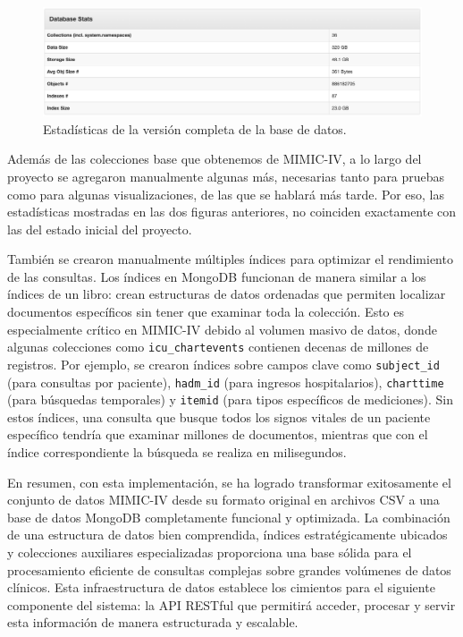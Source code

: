 \begin{figure}[H]
    \centering
    \includegraphics[width=1\textwidth]{imagenes/stats_full.png}
    \caption{Estadísticas de la versión completa de la base de datos.}
    \label{fig:stats_full}
\end{figure}


Además de las colecciones base que obtenemos de MIMIC-IV, a lo largo del proyecto se agregaron manualmente algunas más, necesarias tanto para pruebas como para algunas visualizaciones, de las que se hablará más tarde. Por eso, las estadísticas mostradas en las dos figuras anteriores, no coinciden exactamente con las del estado inicial del proyecto. 

También se crearon manualmente múltiples índices para optimizar el rendimiento de las consultas. Los índices en MongoDB funcionan de manera similar a los índices de un libro: crean estructuras de datos ordenadas que permiten localizar documentos específicos sin tener que examinar toda la colección. Esto es especialmente crítico en MIMIC-IV debido al volumen masivo de datos, donde algunas colecciones como \texttt{icu\_chartevents} contienen decenas de millones de registros. Por ejemplo, se crearon índices sobre campos clave como \texttt{subject\_id} (para consultas por paciente), \texttt{hadm\_id} (para ingresos hospitalarios), \texttt{charttime} (para búsquedas temporales) y \texttt{itemid} (para tipos específicos de mediciones). Sin estos índices, una consulta que busque todos los signos vitales de un paciente específico tendría que examinar millones de documentos, mientras que con el índice correspondiente la búsqueda se realiza en milisegundos.


En resumen, con esta implementación, se ha logrado transformar exitosamente el conjunto de datos MIMIC-IV desde su formato original en archivos CSV a una base de datos MongoDB completamente funcional y optimizada. La combinación de una estructura de datos bien comprendida, índices estratégicamente ubicados y colecciones auxiliares especializadas proporciona una base sólida para el procesamiento eficiente de consultas complejas sobre grandes volúmenes de datos clínicos. Esta infraestructura de datos establece los cimientos para el siguiente componente del sistema: la API RESTful que permitirá acceder, procesar y servir esta información de manera estructurada y escalable.





